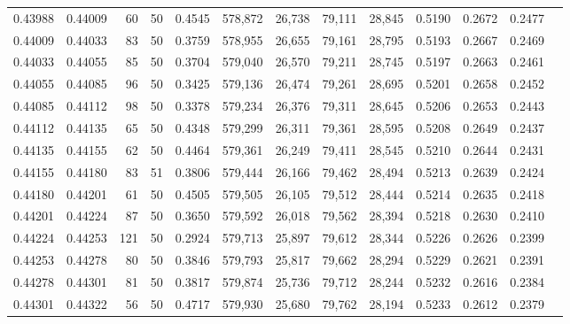 \begin{tabular}{rrrrrrrrrrrrr}
0.43988 & 0.44009 &    60 &  50 &                                     0.4545 & 578,872 &  26,738 &  79,111 &  28,845 & 0.5190 & 0.2672 & 0.2477 \\
0.44009 & 0.44033 &    83 &  50 &                                     0.3759 & 578,955 &  26,655 &  79,161 &  28,795 & 0.5193 & 0.2667 & 0.2469 \\
0.44033 & 0.44055 &    85 &  50 &                                     0.3704 & 579,040 &  26,570 &  79,211 &  28,745 & 0.5197 & 0.2663 & 0.2461 \\
0.44055 & 0.44085 &    96 &  50 &                                     0.3425 & 579,136 &  26,474 &  79,261 &  28,695 & 0.5201 & 0.2658 & 0.2452 \\
0.44085 & 0.44112 &    98 &  50 &                                     0.3378 & 579,234 &  26,376 &  79,311 &  28,645 & 0.5206 & 0.2653 & 0.2443 \\
0.44112 & 0.44135 &    65 &  50 &                                     0.4348 & 579,299 &  26,311 &  79,361 &  28,595 & 0.5208 & 0.2649 & 0.2437 \\
0.44135 & 0.44155 &    62 &  50 &                                     0.4464 & 579,361 &  26,249 &  79,411 &  28,545 & 0.5210 & 0.2644 & 0.2431 \\
0.44155 & 0.44180 &    83 &  51 &                                     0.3806 & 579,444 &  26,166 &  79,462 &  28,494 & 0.5213 & 0.2639 & 0.2424 \\
0.44180 & 0.44201 &    61 &  50 &                                     0.4505 & 579,505 &  26,105 &  79,512 &  28,444 & 0.5214 & 0.2635 & 0.2418 \\
0.44201 & 0.44224 &    87 &  50 &                                     0.3650 & 579,592 &  26,018 &  79,562 &  28,394 & 0.5218 & 0.2630 & 0.2410 \\
0.44224 & 0.44253 &   121 &  50 &                                     0.2924 & 579,713 &  25,897 &  79,612 &  28,344 & 0.5226 & 0.2626 & 0.2399 \\
0.44253 & 0.44278 &    80 &  50 &                                     0.3846 & 579,793 &  25,817 &  79,662 &  28,294 & 0.5229 & 0.2621 & 0.2391 \\
0.44278 & 0.44301 &    81 &  50 &                                     0.3817 & 579,874 &  25,736 &  79,712 &  28,244 & 0.5232 & 0.2616 & 0.2384 \\
0.44301 & 0.44322 &    56 &  50 &                                     0.4717 & 579,930 &  25,680 &  79,762 &  28,194 & 0.5233 & 0.2612 & 0.2379 \\

\end{tabular}
